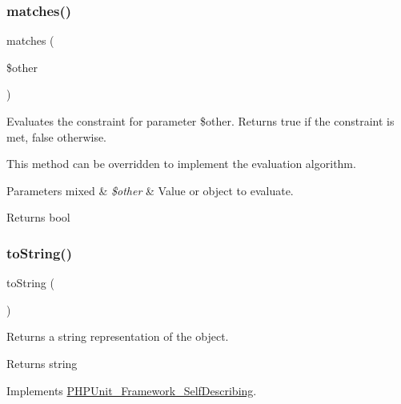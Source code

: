 \subsubsection{\texorpdfstring{matches()}{matches()}}
{\footnotesize\ttfamily matches (\begin{DoxyParamCaption}\item[{}]{\$other }\end{DoxyParamCaption})\hspace{0.3cm}{\ttfamily [protected]}}

Evaluates the constraint for parameter \$other. Returns true if the constraint is met, false otherwise.

This method can be overridden to implement the evaluation algorithm.


\begin{DoxyParams}[1]{Parameters}
mixed & {\em \$other} & Value or object to evaluate.\\
\hline
\end{DoxyParams}
\begin{DoxyReturn}{Returns}
bool 
\end{DoxyReturn}
\mbox{\label{class_p_h_p_unit___framework___constraint___json_matches_a5558c5d549f41597377fa1ea8a1cefa3}} 
\subsubsection{\texorpdfstring{to\+String()}{toString()}}
{\footnotesize\ttfamily to\+String (\begin{DoxyParamCaption}{ }\end{DoxyParamCaption})}

Returns a string representation of the object.

\begin{DoxyReturn}{Returns}
string 
\end{DoxyReturn}


Implements \mbox{\hyperlink{interface_p_h_p_unit___framework___self_describing_a5558c5d549f41597377fa1ea8a1cefa3}{P\+H\+P\+Unit\+\_\+\+Framework\+\_\+\+Self\+Describing}}.



